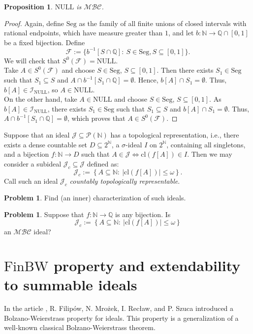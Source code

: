 \documentclass{amsart}
\newtheorem{prop}[thm]{Proposition}
\theoremstyle{definition}
\newtheorem{problem}[thm]{Problem}
\newcommand{\N}{{\mathbb N}}
\newcommand{\Q}{{\mathbb Q}}
\newcommand{\I}{\mathcal I}
\newcommand{\J}{\mathcal J}
\newcommand{\calF}{\mathcal{F}}
\newcommand{\finbw}{\text{FinBW}}
\newcommand{\MB}{S^0}
\newcommand{\MBC}{\mathcal{MBC}}
\newcommand{\Seg}{\mathrm{Seg}}
\newcommand{\NULL}{\mathrm{NULL}}
\newcommand{\INULL}{\I_\mathrm{NULL}}
\newcommand{\cl}{\mathrm{cl}}
\begin{document}
\begin{prop}
$\NULL$ is $\MBC$.
\end{prop}

\begin{proof}
Again, define $\Seg$ as the family of all finite unions of closed intervals with rational endpoints, which have measure greater than $1$, and let $b\colon \N \to \Q\cap [0,1]$ be a fixed bijection.
Define 
$$\calF := \{b^{-1}[S\cap\Q] :\ S\in\Seg, S\subseteq [0,1]\}.$$
We will check that $\MB(\calF) = \NULL$.\\
Take $A\in \MB(\calF)$ and choose $S\in\Seg$, $S\subseteq [0,1]$. Then there exists $S_1\in\Seg$ such that $S_1\subseteq S$ and $A\cap b^{-1}[S_1\cap\Q] = \emptyset$. Hence, $b[A] \cap S_1 = \emptyset$. Thus, $b[A]\in\INULL$, so $A\in\NULL$.\\
On the other hand, take $A\in \NULL$ and choose $S\in\Seg$, $S\subseteq [0,1]$. As $b[A]\in\INULL$, there exists $S_1\in \Seg$ such that $S_1\subseteq S$ and $b[A]\cap S_1 = \emptyset$. Thus, $A \cap b^{-1}[S_1\cap\Q] = \emptyset$, which proves that $A\in \MB(\calF)$.
\end{proof}


Suppose that an ideal $\mathcal{J}\subseteq \mathcal{P}(\N)$ has a topological representation, i.e., there exists a dense countable set $D\subseteq 2^{\N}$, a $\sigma$-ideal $I$ on $2^{\N}$, containing all singletons, and a bijection $f\colon\N\to D$ such that $A\in\J \Leftrightarrow \cl(f[A])\in I$. Then we may consider a subideal $\J_c \subseteq \J$ defined as:
$$\J_c :=\left\{A\subseteq \N :\ |\cl(f[A])| \leq \omega\right\}.$$
Call such an ideal $\J_c$ \emph{countably topologically representable}.

\begin{problem}
Find (an inner) characterization of such ideals.
\end{problem}

\begin{problem}
Suppose that $f\colon\N\to\Q$ is any bijection. Is 
$$\J_c :=\left\{A\subseteq \N :\ |\cl(f[A])| \leq \omega\right\}$$
an $\MBC$ ideal?
\end{problem}

  
\section{$\finbw$ property and extendability to summable ideals}		



In the article \cite{H1}, R. Filip\'ow, N. Mro\.zek, I. Rec\l{}aw, and P. Szuca introduced a Bolzano-Weierstrass property for ideals. This property is a generalization of a well-known classical Bolzano-Weierstrass theorem.
\end{document}
